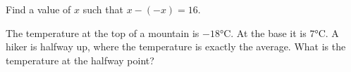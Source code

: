 \begin{challengeBox}

\prob Find a value of $x$ such that $x - (-x) = 16$. \answerBlank[2cm]

\prob The temperature at the top of a mountain is $-18°$C. At the base it is $7°$C. A hiker is halfway up, where the temperature is exactly the average. What is the temperature at the halfway point? \answerBlank[3cm]

\end{challengeBox}

